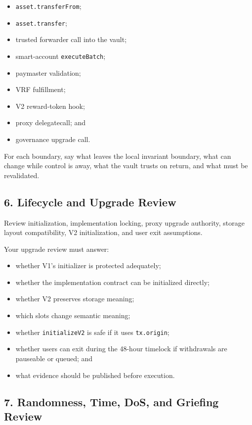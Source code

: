 \begin{itemize}
\item \texttt{asset.transferFrom};
\item \texttt{asset.transfer};
\item trusted forwarder call into the vault;
\item smart-account \texttt{executeBatch};
\item paymaster validation;
\item VRF fulfillment;
\item V2 reward-token hook;
\item proxy delegatecall; and
\item governance upgrade call.
\end{itemize}

For each boundary, say what leaves the local invariant boundary, what can change while control is away, what the vault trusts on return, and what must be revalidated.

\subsection*{6. Lifecycle and Upgrade Review}

Review initialization, implementation locking, proxy upgrade authority, storage layout compatibility, V2 initialization, and user exit assumptions.

Your upgrade review must answer:

\begin{itemize}
\item whether V1's initializer is protected adequately;
\item whether the implementation contract can be initialized directly;
\item whether V2 preserves storage meaning;
\item which slots change semantic meaning;
\item whether \texttt{initializeV2} is safe if it uses \texttt{tx.origin};
\item whether users can exit during the 48-hour timelock if withdrawals are pauseable or queued; and
\item what evidence should be published before execution.
\end{itemize}

\subsection*{7. Randomness, Time, DoS, and Griefing Review}

